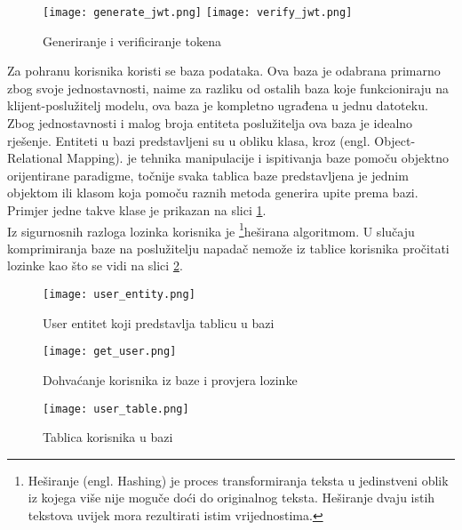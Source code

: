 \begin{figure}[h]
  \texttt{[image: generate\_jwt.png]}
  \texttt{[image: verify\_jwt.png]}
  \caption{Generiranje i verificiranje tokena}
\end{figure}

Za pohranu korisnika koristi se  baza podataka.
\paraBreak
Ova baza je odabrana primarno zbog svoje jednostavnosti, naime za razliku od ostalih baza koje funkcioniraju na
klijent-poslužitelj modelu, ova baza je kompletno ugrađena u jednu datoteku. \cite{SQLite} \\
Zbog jednostavnosti i malog broja entiteta poslužitelja ova baza je idealno rješenje.
\paraBreak
Entiteti u bazi predstavljeni su u obliku klasa, kroz  (engl. Object-Relational Mapping).
 je tehnika manipulacije i ispitivanja baze pomoču objektno orijentirane paradigme, točnije svaka tablica
baze predstavljena je jednim objektom ili klasom koja pomoču raznih metoda generira  upite prema bazi.
Primjer jedne takve klase je prikazan na slici \ref{pic:orm-entity}.
\\
Iz sigurnosnih razloga lozinka korisnika je \footnote
{
  Heširanje (engl. Hashing) je proces transformiranja teksta u jedinstveni oblik iz kojega više nije moguče doći
  do originalnog teksta. Heširanje dvaju istih tekstova uvijek mora rezultirati istim vrijednostima.
}{heširana} 
 algoritmom. 
U slučaju komprimiranja baze na poslužitelju napadač nemože iz tablice korisnika pročitati lozinke kao što se vidi
na slici \ref{pic:hashed_password}.

\begin{figure}[h]
  \texttt{[image: user\_entity.png]}
  \caption{User entitet koji predstavlja tablicu u bazi}
  \label{pic:orm-entity}
\end{figure}

\begin{figure}[h]
  \texttt{[image: get\_user.png]}
  \caption{Dohvaćanje korisnika iz baze i provjera lozinke}
\end{figure}

\begin{figure}[h]
  \texttt{[image: user\_table.png]}
  \caption{Tablica korisnika u bazi}
  \label{pic:hashed_password}
\end{figure}

\clearpage
